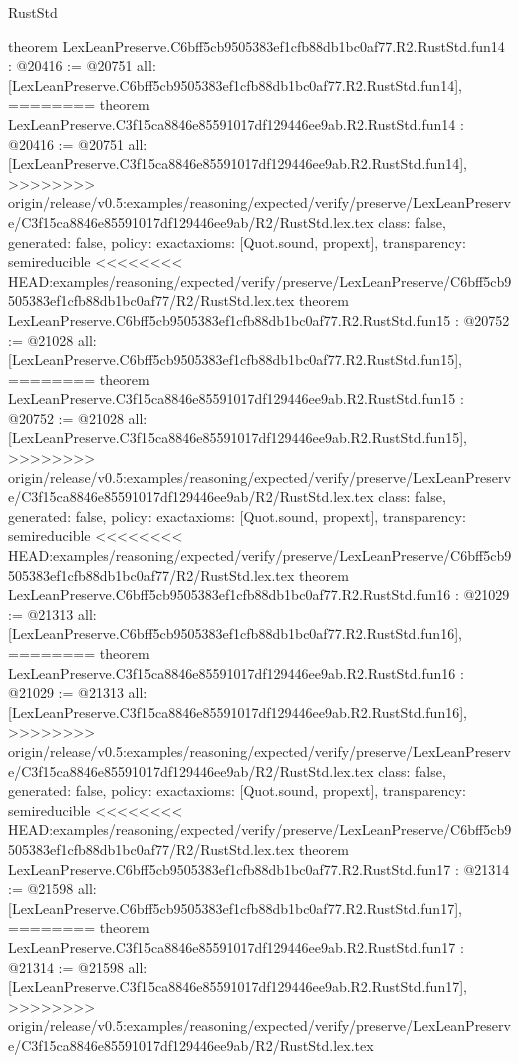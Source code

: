 \begin{lexlean}{RustStd}
\begin{coremodule}
{\begin{coremodule}
{{{{{{{{{{{{{{{{theorem LexLeanPreserve.C6bff5cb9505383ef1cfb88db1bc0af77.R2.RustStd.fun14 : @20416 := @20751 {
  all: [LexLeanPreserve.C6bff5cb9505383ef1cfb88db1bc0af77.R2.RustStd.fun14],
========
theorem LexLeanPreserve.C3f15ca8846e85591017df129446ee9ab.R2.RustStd.fun14 : @20416 := @20751 {
  all: [LexLeanPreserve.C3f15ca8846e85591017df129446ee9ab.R2.RustStd.fun14],
>>>>>>>> origin/release/v0.5:examples/reasoning/expected/verify/preserve/LexLeanPreserve/C3f15ca8846e85591017df129446ee9ab/R2/RustStd.lex.tex
  class: false,
  generated: false,
  policy: exact{axioms: [Quot.sound, propext]},
  transparency: semireducible
}
<<<<<<<< HEAD:examples/reasoning/expected/verify/preserve/LexLeanPreserve/C6bff5cb9505383ef1cfb88db1bc0af77/R2/RustStd.lex.tex
theorem LexLeanPreserve.C6bff5cb9505383ef1cfb88db1bc0af77.R2.RustStd.fun15 : @20752 := @21028 {
  all: [LexLeanPreserve.C6bff5cb9505383ef1cfb88db1bc0af77.R2.RustStd.fun15],
========
theorem LexLeanPreserve.C3f15ca8846e85591017df129446ee9ab.R2.RustStd.fun15 : @20752 := @21028 {
  all: [LexLeanPreserve.C3f15ca8846e85591017df129446ee9ab.R2.RustStd.fun15],
>>>>>>>> origin/release/v0.5:examples/reasoning/expected/verify/preserve/LexLeanPreserve/C3f15ca8846e85591017df129446ee9ab/R2/RustStd.lex.tex
  class: false,
  generated: false,
  policy: exact{axioms: [Quot.sound, propext]},
  transparency: semireducible
}
<<<<<<<< HEAD:examples/reasoning/expected/verify/preserve/LexLeanPreserve/C6bff5cb9505383ef1cfb88db1bc0af77/R2/RustStd.lex.tex
theorem LexLeanPreserve.C6bff5cb9505383ef1cfb88db1bc0af77.R2.RustStd.fun16 : @21029 := @21313 {
  all: [LexLeanPreserve.C6bff5cb9505383ef1cfb88db1bc0af77.R2.RustStd.fun16],
========
theorem LexLeanPreserve.C3f15ca8846e85591017df129446ee9ab.R2.RustStd.fun16 : @21029 := @21313 {
  all: [LexLeanPreserve.C3f15ca8846e85591017df129446ee9ab.R2.RustStd.fun16],
>>>>>>>> origin/release/v0.5:examples/reasoning/expected/verify/preserve/LexLeanPreserve/C3f15ca8846e85591017df129446ee9ab/R2/RustStd.lex.tex
  class: false,
  generated: false,
  policy: exact{axioms: [Quot.sound, propext]},
  transparency: semireducible
}
<<<<<<<< HEAD:examples/reasoning/expected/verify/preserve/LexLeanPreserve/C6bff5cb9505383ef1cfb88db1bc0af77/R2/RustStd.lex.tex
theorem LexLeanPreserve.C6bff5cb9505383ef1cfb88db1bc0af77.R2.RustStd.fun17 : @21314 := @21598 {
  all: [LexLeanPreserve.C6bff5cb9505383ef1cfb88db1bc0af77.R2.RustStd.fun17],
========
theorem LexLeanPreserve.C3f15ca8846e85591017df129446ee9ab.R2.RustStd.fun17 : @21314 := @21598 {
  all: [LexLeanPreserve.C3f15ca8846e85591017df129446ee9ab.R2.RustStd.fun17],
>>>>>>>> origin/release/v0.5:examples/reasoning/expected/verify/preserve/LexLeanPreserve/C3f15ca8846e85591017df129446ee9ab/R2/RustStd.lex.tex
}}}}}}}}}}}}}}}}}}}}}
\end{coremodule}}
\end{coremodule}
\end{lexlean}
